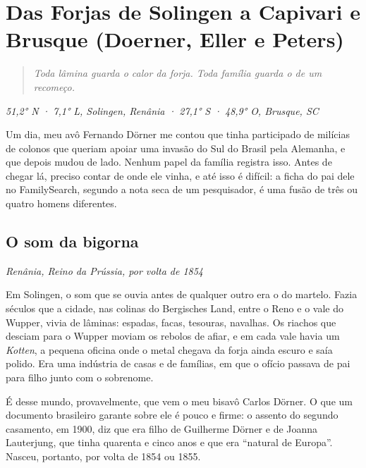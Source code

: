 \documentclass[
  brazilian,
  11pt,
  openany]{book}
\begin{document}
\chapter{Das Forjas de Solingen a Capivari e Brusque (Doerner, Eller e
Peters)}\label{cap-10}

\begin{quote}
\emph{Toda lâmina guarda o calor da forja. Toda família guarda o de um
recomeço.}
\end{quote}

\emph{51,2° N · 7,1° L, Solingen, Renânia · 27,1° S · 48,9° O, Brusque,
SC}

Um dia, meu avô Fernando Dörner me contou que tinha participado de
milícias de colonos que queriam apoiar uma invasão do Sul do Brasil pela
Alemanha, e que depois mudou de lado. Nenhum papel da família registra
isso. Antes de chegar lá, preciso contar de onde ele vinha, e até isso é
difícil: a ficha do pai dele no FamilySearch, segundo a nota seca de um
pesquisador, é uma fusão de três ou quatro homens diferentes.

\section{O som da bigorna}\label{o-som-da-bigorna}

\emph{Renânia, Reino da Prússia, por volta de 1854}

Em Solingen, o som que se ouvia antes de qualquer outro era o do
martelo. Fazia séculos que a cidade, nas colinas do Bergisches Land,
entre o Reno e o vale do Wupper, vivia de lâminas: espadas, facas,
tesouras, navalhas. Os riachos que desciam para o Wupper moviam os
rebolos de afiar, e em cada vale havia um \emph{Kotten}, a pequena
oficina onde o metal chegava da forja ainda escuro e saía polido. Era
uma indústria de casas e de famílias, em que o ofício passava de pai
para filho junto com o sobrenome.

É desse mundo, provavelmente, que vem o meu bisavô Carlos Dörner. O que
um documento brasileiro garante sobre ele é pouco e firme: o assento do
segundo casamento, em 1900, diz que era filho de Guilherme Dörner e de
Joanna Lauterjung, que tinha quarenta e cinco anos e que era ``natural
de Europa''. Nasceu, portanto, por volta de 1854 ou 1855.
\end{document}
